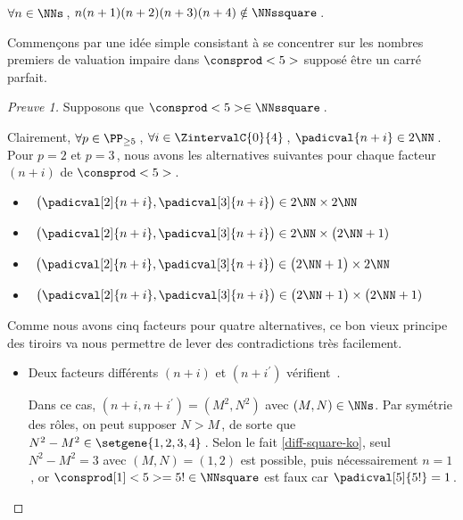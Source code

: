 \begin{fact} \label{case-5}
	 $\forall n \in \NNs$\,, $n(n+1)(n+2)(n+3)(n+4) \notin \NNssquare$\,.
\end{fact}




Commençons par une idée simple consistant à se concentrer sur les nombres premiers de valuation impaire dans $\consprod<5>$ supposé être un carré parfait.


\begin{proof}[Preuve 1]%
    Supposons que $\consprod<5> \in \NNssquare$\,.
    
    \smallskip
    
    Clairement, 
    $\forall p \in \PP_{\geq 5}$\,, 
    $\forall i \in \ZintervalC{0}{4}$\,, 
    $\padicval{n + i} \in 2 \NN$\,.
    Pour $p = 2$ et $p = 3$\,, nous avons les alternatives suivantes pour chaque facteur $(n+i)$ de $\consprod<5>$\,.
    \begin{itemize}
    	\smallskip
		\item {}\,
		$\big( \padicval[2]{n + i} , \padicval[3]{n + i} \big) \in 2 \NN \times 2 \NN$

    	\smallskip
		\item {}\,
		$\big( \padicval[2]{n + i} , \padicval[3]{n + i} \big) \in 2 \NN \times \big( 2 \NN + 1)$

    	\smallskip
		\item {}\,
		$\big( \padicval[2]{n + i} , \padicval[3]{n + i} \big) \in \big( 2 \NN + 1 \big) \times 2 \NN$

    	\smallskip
		\item {}\,
		$\big( \padicval[2]{n + i} , \padicval[3]{n + i} \big) \in \big( 2 \NN + 1 \big) \times \big( 2 \NN + 1)$
    \end{itemize}
    
    \medskip
    
    Comme nous avons cinq facteurs pour quatre alternatives, ce bon vieux principe des tiroirs va nous permettre de lever des contradictions très facilement.
    \begin{itemize}
    	\medskip
		\item Deux facteurs différents $(n+i)$ et $(n+i^\prime)$ vérifient \,.
		
		\smallskip
		\noindent
		Dans ce cas, $(n+i, n+i^\prime) = (M^2, N^2)$ avec $(M, N) \in \NNs$.
		Par symétrie des rôles, on peut supposer $N > M$\,, de sorte que $N^2 - M^2 \in \setgene{1, 2, 3, 4}$\,. 
		Selon le fait \ref{diff-square-ko}, seul $N^2 - M^2 = 3$ avec $(M, N) = (1, 2)$ est possible, puis nécessairement $n = 1$\,, or $\consprod[1]<5> = 5 ! \in \NNsquare$ est faux car $\padicval[5]{5!} = 1$\,.
		

\end{itemize}
\end{proof}
